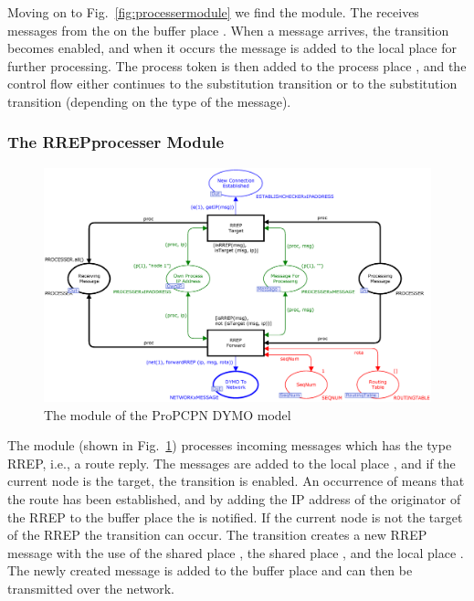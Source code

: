 Moving on to Fig.~\ref{fig:processermodule} we find the  module. The  receives messages from the  on the buffer place . When a message arrives, the transition  becomes enabled, and when it occurs the message is added to the local place  for further processing. The process token is then added to the process place , and the control flow either continues to the substitution transition  or to the substitution transition  (depending on the type of the message).

\subsubsection{The RREPprocesser Module}
\begin{figure}
\centering
\includegraphics[width=\textwidth]{dymo/graphics/rrepprocessermodule.eps}
\caption{The  module of the ProPCPN DYMO model}
\label{fig:rrepprocessermodule}
\end{figure}

The  module (shown in Fig.~\ref{fig:rrepprocessermodule}) processes incoming messages which has the type RREP, i.e., a route reply. The messages are added to the local place , and if the current node is the target, the transition  is enabled. An occurrence of  means that the route has been established, and by adding the IP address of the originator of the RREP to the buffer place  the  is notified. If the current node is not the target of the RREP the transition  can occur. The transition  creates a new RREP message with the use of the shared place , the shared place , and the local place . The newly created message is added to the buffer place  and can then be transmitted over the network.
